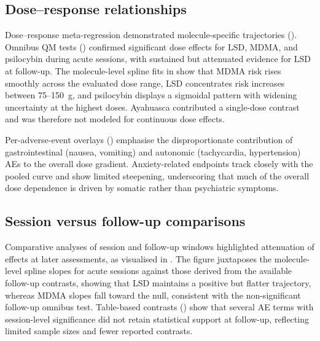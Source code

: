 \subsection{Dose--response relationships}
Dose--response meta-regression demonstrated molecule-specific trajectories (). Omnibus QM tests () confirmed significant dose effects for LSD, MDMA, and psilocybin during acute sessions, with sustained but attenuated evidence for LSD at follow-up. The molecule-level spline fits in  show that MDMA risk rises smoothly across the evaluated dose range, LSD concentrates risk increases between 75--150~\textmu g, and psilocybin displays a sigmoidal pattern with widening uncertainty at the highest doses. Ayahuasca contributed a single-dose contrast and was therefore not modeled for continuous dose effects.

Per-adverse-event overlays () emphasise the disproportionate contribution of gastrointestinal (nausea, vomiting) and autonomic (tachycardia, hypertension) AEs to the overall dose gradient. Anxiety-related endpoints track closely with the pooled curve and show limited steepening, underscoring that much of the overall dose dependence is driven by somatic rather than psychiatric symptoms.

\subsection{Session versus follow-up comparisons}
Comparative analyses of session and follow-up windows highlighted attenuation of effects at later assessments, as visualised in . The figure juxtaposes the molecule-level spline slopes for acute sessions against those derived from the available follow-up contrasts, showing that LSD maintains a positive but flatter trajectory, whereas MDMA slopes fall toward the null, consistent with the non-significant follow-up omnibus test. Table-based contrasts () show that several AE terms with session-level significance did not retain statistical support at follow-up, reflecting limited sample sizes and fewer reported contrasts.


